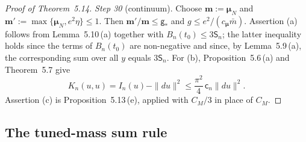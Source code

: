 \documentclass[11pt,letterpaper,reqno]{amsart}
\theoremstyle{definition}
\begin{document}
\begin{proof}[Proof of Theorem~5.14]
\emph{Step 30} (continuum).
Choose $\mathbf m:=\boldsymbol\mu_N$ and $\mathbf m':=\max\{\boldsymbol\mu_N,e^2\eta\}\le1$.
Then $\mathbf m'/\mathbf m\le\mathsf g_*$ and $g\le e^2/(c_{\boldsymbol\mu}\bar m)$.
Assertion (a) follows from Lemma~5.10\,(a) together with $B_n(t_0)\le3\mathsf S_n$; the latter inequality holds since the terms of $B_n(t_0)$ are non-negative and since, by Lemma~5.9\,(a), the corresponding sum over all $y$ equals $3\mathsf S_n$.
For (b), Proposition~5.6\,(a) and Theorem~5.7 give
\begin{equation*}
K_n(u,u)=I_n(u)-\|du\|^2\le\frac{\pi^2}{4}\,\mathsf c_n\|du\|^2.
\end{equation*}
Assertion (c) is Proposition~5.13\,(e), applied with $C_M/3$ in place of $C_M$.
\end{proof}
\subsection{The tuned-mass sum rule}
\end{document}
